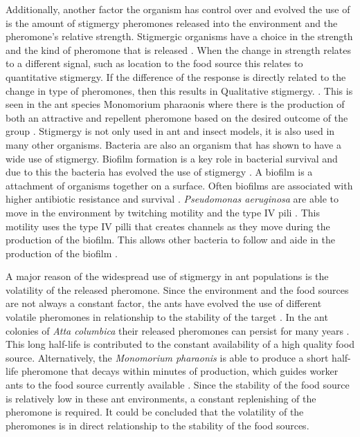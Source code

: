 Additionally, another factor the organism has control over and evolved the use of is the amount of stigmergy pheromones released into the environment and the pheromone’s relative strength.
Stigmergic organisms have a choice in the strength and the kind of pheromone that is released \cite{dorigo_ant_2000}.
When the change in strength relates to a different signal, such as location to the food source this relates to quantitative stigmergy.
If the difference of the response is directly related to the change in type of pheromones, then this results in Qualitative stigmergy.
\cite{heylighen_stigmergy_2016b}.
This is seen in the ant species Monomorium pharaonis where there is the production of both an attractive and repellent pheromone based on the desired outcome of the group \cite{jeanson_pheromone_2003}.
Stigmergy is not only used in ant and insect models, it is also used in many other organisms.
Bacteria are also an organism that has shown to have a wide use of stigmergy.
Biofilm formation is a key role in bacterial survival and due to this the bacteria has evolved the use of stigmergy \cite{gloag_bacterial_2015}.
A biofilm is a attachment of organisms together on a surface.
Often biofilms are associated with higher antibiotic resistance and survival \cite{donlan2002biofilms}.
\textit{Pseudomonas aeruginosa} are able to move in the environment by twitching motility and the type IV pili \cite{persat2015type}.
This motility uses the type IV pilli that creates channels as they move during the production of the biofilm.
This allows other bacteria to follow and aide in the production of the biofilm \cite{gloag_stigmergy:_2013}.

A major reason of the widespread use of stigmergy in ant populations is the volatility of the released pheromone.
Since the environment and the food sources are not always a constant factor, the ants have evolved the use of different volatile pheromones in relationship to the stability of the target \cite{jeanson_pheromone_2003}.
In the ant colonies of \textit{Atta columbica} their released pheromones can persist for many years \cite{howard_costs_2001}.
This long half-life is contributed to the constant availability of a high quality food source.
Alternatively, the \textit{Monomorium pharaonis} is able to produce a short half-life pheromone that decays within minutes of production, which guides worker ants to the food source currently available \cite{robinson_decay_2008}.
Since the stability of the food source is relatively low in these ant environments, a constant replenishing of the pheromone is required.
It could be concluded that the volatility of the pheromones is in direct relationship to the stability of the food sources.
